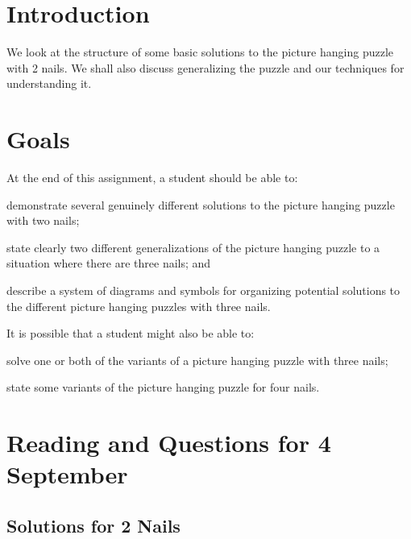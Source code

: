 \documentclass[12pt,letterpaper]{article}
\theoremstyle{definition}
\begin{document}
\setlength{\parskip}{1ex plus 0.5ex minus 0.2ex}
\setlength{\parindent}{0pt}

\pagestyle{fancy}
\cfoot{} 

\section*{Introduction}
We look at the structure of some basic solutions to the picture hanging puzzle with 2 nails.
We shall also discuss generalizing the puzzle and our techniques for understanding it.

\section*{Goals}
At the end of this assignment, a student should be able to:
\begin{compactitem}
\item demonstrate several genuinely different solutions to the picture hanging puzzle with two nails;
\item state clearly two different generalizations of the picture hanging puzzle to a situation where there are three nails; and
\item describe a system of diagrams and symbols for organizing potential solutions to the different picture hanging puzzles with three nails.
\end{compactitem}
It is possible that a student might also be able to:
\begin{compactitem}
\item solve one or both of the variants of a picture hanging puzzle with three nails;
\item state some variants of the picture hanging puzzle for four nails.
\end{compactitem}

\section*{Reading and Questions for 4 September}

\subsection*{Solutions for 2 Nails}
\end{document}
